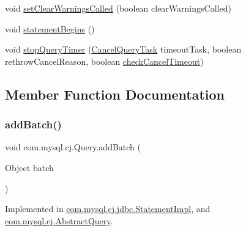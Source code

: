 \begin{DoxyCompactItemize}
\item 
void \mbox{\hyperlink{interfacecom_1_1mysql_1_1cj_1_1_query_a7ee7a059fdd6b703d9def2d3bd77a52f}{set\+Clear\+Warnings\+Called}} (boolean clear\+Warnings\+Called)
\item 
void \mbox{\hyperlink{interfacecom_1_1mysql_1_1cj_1_1_query_a103f171654654e894600c59f324b651b}{statement\+Begins}} ()
\item 
void \mbox{\hyperlink{interfacecom_1_1mysql_1_1cj_1_1_query_a2bee69e6ff58bb35af496297e1803c41}{stop\+Query\+Timer}} (\mbox{\hyperlink{interfacecom_1_1mysql_1_1cj_1_1_cancel_query_task}{Cancel\+Query\+Task}} timeout\+Task, boolean rethrow\+Cancel\+Reason, boolean \mbox{\hyperlink{interfacecom_1_1mysql_1_1cj_1_1_query_add91f39e25b2687d5ae8637d59e470f5}{check\+Cancel\+Timeout}})
\end{DoxyCompactItemize}


\subsection{Member Function Documentation}
\mbox{\label{interfacecom_1_1mysql_1_1cj_1_1_query_a726941dcc741acae509b16f14730966a}} 
\subsubsection{\texorpdfstring{add\+Batch()}{addBatch()}}
{\footnotesize\ttfamily void com.\+mysql.\+cj.\+Query.\+add\+Batch (\begin{DoxyParamCaption}\item[{Object}]{batch }\end{DoxyParamCaption})}



Implemented in \mbox{\hyperlink{classcom_1_1mysql_1_1cj_1_1jdbc_1_1_statement_impl_a9fff3c6369792a80971d749bc3d2303a}{com.\+mysql.\+cj.\+jdbc.\+Statement\+Impl}}, and \mbox{\hyperlink{classcom_1_1mysql_1_1cj_1_1_abstract_query_ac2dda664631f654d91ec3e0f5a53a4dd}{com.\+mysql.\+cj.\+Abstract\+Query}}.

\mbox{\label{interfacecom_1_1mysql_1_1cj_1_1_query_add91f39e25b2687d5ae8637d59e470f5}} 
